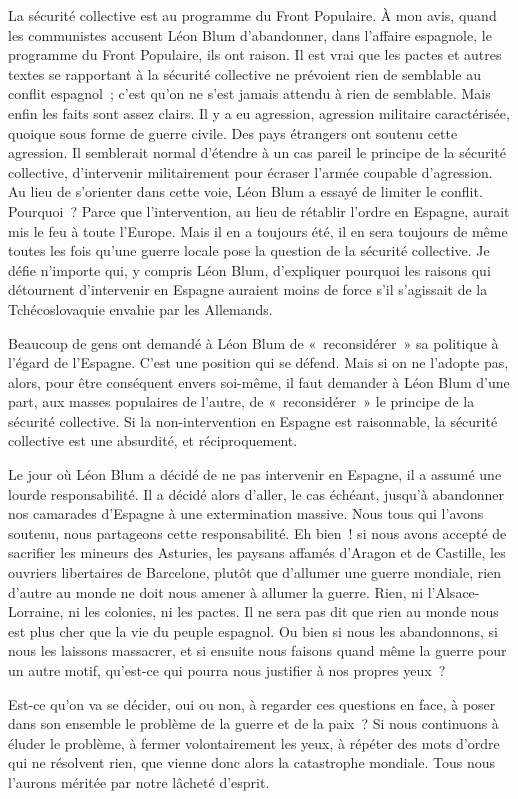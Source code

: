 \documentclass[french,twoside]{book} %
\begin{document}
La sécurité collective est au programme du Front Populaire. À mon avis, quand les communistes accusent Léon Blum d'abandonner, dans l'affaire espagnole, le programme du Front Populaire, ils ont raison. Il est vrai que les pactes et autres textes se rapportant à la sécurité collective ne prévoient rien de semblable au conflit espagnol ; c'est qu'on ne s'est jamais attendu à rien de semblable. Mais enfin les faits sont assez clairs. Il y a eu agression, agression militaire caractérisée, quoique sous forme de guerre civile. Des pays étrangers ont soutenu cette agression. Il semblerait normal d'étendre à un cas pareil le principe de la sécurité collective, d'intervenir militairement pour écraser l'armée coupable d'agression. Au lieu de s'orienter dans cette voie, Léon Blum a essayé de limiter le conflit. Pourquoi ? Parce que l'intervention, au lieu de rétablir l'ordre en Espagne, aurait mis le feu à toute l'Europe. Mais il en a toujours été, il en sera toujours de même toutes les fois qu'une guerre locale pose la question de la sécurité collective. Je défie n'importe qui, y compris Léon Blum, d'expliquer pourquoi les raisons qui détournent d'intervenir en Espagne auraient moins de force s'il s'agissait de la Tchécoslovaquie envahie par les Allemands.\par
Beaucoup de gens ont demandé à Léon Blum de « reconsidérer » sa politique à l'égard de l'Espagne. C'est une position qui se défend. Mais si on ne l'adopte pas, alors, pour être conséquent envers soi-même, il faut demander à Léon Blum d'une part, aux masses populaires de l'autre, de « reconsidérer » le principe de la sécurité collective. Si la non-intervention en Espagne est raisonnable, la sécurité collective est une absurdité, et réciproquement.\par
Le jour où Léon Blum a décidé de ne pas intervenir en Espagne, il a assumé une lourde responsabilité. Il a décidé alors d'aller, le cas échéant, jusqu'à abandonner nos camarades d'Espagne à une extermination massive. Nous tous qui l'avons soutenu, nous partageons cette responsabilité. Eh bien ! si nous avons accepté de sacrifier les mineurs des Asturies, les paysans affamés d'Aragon et de Castille, les ouvriers libertaires de Barcelone, plutôt que d'allumer une guerre mondiale, rien d'autre au monde ne doit nous amener à allumer la guerre. Rien, ni l'Alsace-Lorraine, ni les colonies, ni les pactes. Il ne sera pas dit que rien au monde nous est plus cher que la vie du peuple espagnol. Ou bien si nous les abandonnons, si nous les laissons massacrer, et si ensuite nous faisons quand même la guerre pour un autre motif, qu'est-ce qui pourra nous justifier à nos propres yeux ?\par
Est-ce qu'on va se décider, oui ou non, à regarder ces questions en face, à poser dans son ensemble le problème de la guerre et de la paix ? Si nous continuons à éluder le problème, à fermer volontairement les yeux, à répéter des mots d'ordre qui ne résolvent rien, que vienne donc alors la catastrophe mondiale. Tous nous l'aurons méritée par notre lâcheté d'esprit.\par
\end{document}
